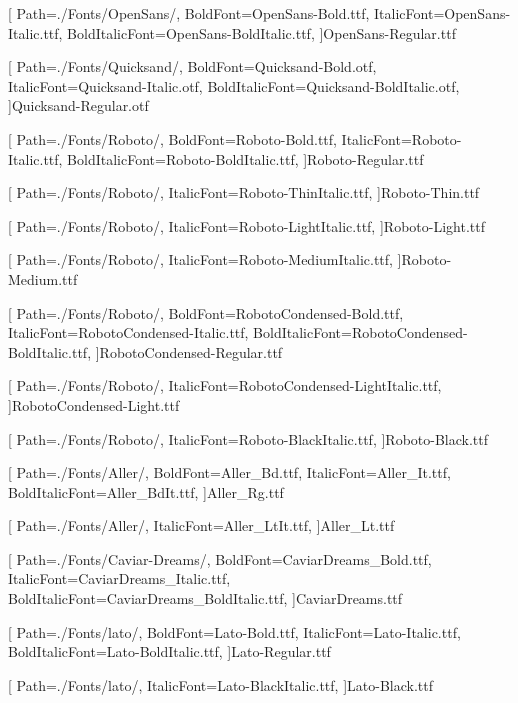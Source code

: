 
\newfontfamily{\opensans}[
Path=./Fonts/OpenSans/,
BoldFont=OpenSans-Bold.ttf,
ItalicFont=OpenSans-Italic.ttf,
BoldItalicFont=OpenSans-BoldItalic.ttf,
]{OpenSans-Regular.ttf}


\newfontfamily{\quicksand}[
Path=./Fonts/Quicksand/,
BoldFont=Quicksand-Bold.otf,
ItalicFont=Quicksand-Italic.otf,
BoldItalicFont=Quicksand-BoldItalic.otf,
]{Quicksand-Regular.otf}


\newfontfamily{\roboto}[
Path=./Fonts/Roboto/,
BoldFont=Roboto-Bold.ttf,
ItalicFont=Roboto-Italic.ttf,
BoldItalicFont=Roboto-BoldItalic.ttf,
]{Roboto-Regular.ttf}

\newfontfamily{\robotot}[
Path=./Fonts/Roboto/,
ItalicFont=Roboto-ThinItalic.ttf,
]{Roboto-Thin.ttf}

\newfontfamily{\robotol}[
Path=./Fonts/Roboto/,
ItalicFont=Roboto-LightItalic.ttf,
]{Roboto-Light.ttf}

\newfontfamily{\robotom}[
Path=./Fonts/Roboto/,
ItalicFont=Roboto-MediumItalic.ttf,
]{Roboto-Medium.ttf}


\newfontfamily{\robotoc}[
Path=./Fonts/Roboto/,
BoldFont=RobotoCondensed-Bold.ttf,
ItalicFont=RobotoCondensed-Italic.ttf,
BoldItalicFont=RobotoCondensed-BoldItalic.ttf,
]{RobotoCondensed-Regular.ttf}


\newfontfamily{\robotocl}[
Path=./Fonts/Roboto/,
ItalicFont=RobotoCondensed-LightItalic.ttf,
]{RobotoCondensed-Light.ttf}


\newfontfamily{\robotob}[
Path=./Fonts/Roboto/,
ItalicFont=Roboto-BlackItalic.ttf,
]{Roboto-Black.ttf}

\newfontfamily{\aller}[
Path=./Fonts/Aller/,
BoldFont=Aller_Bd.ttf,
ItalicFont=Aller_It.ttf,
BoldItalicFont=Aller_BdIt.ttf,
]{Aller_Rg.ttf}

\newfontfamily{\allerl}[
Path=./Fonts/Aller/,
ItalicFont=Aller_LtIt.ttf,
]{Aller_Lt.ttf}

\newfontfamily{\caviar}[
Path=./Fonts/Caviar-Dreams/,
BoldFont=CaviarDreams_Bold.ttf,
ItalicFont=CaviarDreams_Italic.ttf,
BoldItalicFont=CaviarDreams_BoldItalic.ttf,
]{CaviarDreams.ttf}

\newfontfamily{\lato}[
Path=./Fonts/lato/,
BoldFont=Lato-Bold.ttf,
ItalicFont=Lato-Italic.ttf,
BoldItalicFont=Lato-BoldItalic.ttf,
]{Lato-Regular.ttf}

\newfontfamily{\latob}[
Path=./Fonts/lato/,
ItalicFont=Lato-BlackItalic.ttf,
]{Lato-Black.ttf}

